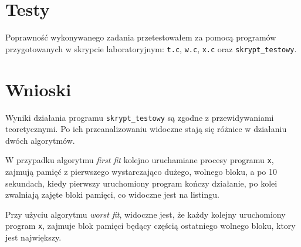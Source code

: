 \documentclass[12pt,a4paper]{article}
\begin{document}
\section{Testy}
Poprawność wykonywanego zadania przetestowałem za pomocą programów przygotowanych w skrypcie laboratoryjnym: \texttt{t.c}, \texttt{w.c}, \texttt{x.c} oraz \texttt{skrypt\_testowy}.

\section{Wnioski}
Wyniki działania programu \texttt{skrypt\_testowy} są zgodne z przewidywaniami teoretycznymi. Po ich przeanalizowaniu widoczne stają się różnice w działaniu dwóch algorytmów.

W przypadku algorytmu \emph{first fit} kolejno uruchamiane procesy programu \texttt{x}, zajmują pamięć z pierwszego wystarczająco dużego, wolnego bloku, a po 10 sekundach, kiedy pierwszy uruchomiony program kończy działanie, po kolei zwalniają zajęte bloki pamięci, co widoczne jest na listingu.

Przy użyciu algorytmu \emph{worst fit}, widoczne jest, że każdy kolejny uruchomiony program \texttt{x}, zajmuje blok pamięci będący częścią ostatniego wolnego bloku, ktory jest największy.
\end{document}
